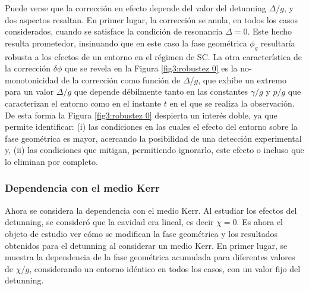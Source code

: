 Puede verse que la corrección en efecto depende del valor del detunning $\Delta/g$, y dos aspectos resaltan. En primer lugar, la corrección se anula, en todos los casos considerados, cuando se satisface la condición de resonancia $\Delta=0$. Este hecho resulta prometedor, insinuando que en este caso la fase geométrica $\phi_g$ resultaría robusta a los efectos de un entorno en el régimen de SC. La otra característica de la corrección $\delta\phi$ que se revela en la Figura \ref{fig3:robustez 0} es la no-monotonicidad de la corrección como función de $\Delta/g$, que exhibe un extremo para un valor $\Delta/g$ que depende débilmente tanto en las constantes $\gamma/g$ y $p/g$ que caracterizan el entorno como en el instante $t$ en el que se realiza la observación. De esta forma la Figura \ref{fig3:robustez 0} despierta un interés doble, ya que permite identificar: (i) las condiciones en las cuales el efecto del entorno sobre la fase geométrica es mayor, acercando la posibilidad de una detección experimental y, (ii) las condiciones que mitigan, permitiendo ignorarlo, este efecto o incluso que lo eliminan por completo.

\subsubsection{Dependencia con el medio Kerr}

Ahora se considera la dependencia con el medio Kerr. Al estudiar los efectos del detunning, se consideró que la cavidad era lineal, es decir $\chi=0$. Es ahora el objeto de estudio ver cómo se modifican la fase geométrica y los resultados obtenidos para el detunning al considerar un medio Kerr. En primer lugar, se muestra la dependencia de la fase geométrica acumulada para diferentes valores de $\chi/g$, considerando un entorno idéntico en todos los casos, con un valor fijo del detunning.

